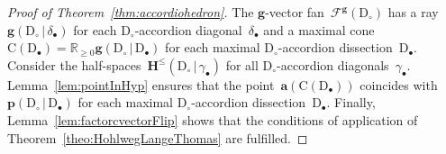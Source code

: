 \documentclass{amsart}
\theoremstyle{definition}
\newcommand{\R}{\mathbb{R}} %
\renewcommand{\b}[1]{\mathbf{#1}} %
\newcommand{\Cone}{\mathrm{C}} %
\newcommand{\dissection}{\mathrm{D}} %
\newcommand{\gvector}[2]{\mathbf{g}(#1 \,|\, #2)} %
\newcommand{\gvectors}[2]{\mathbf{g}(#1 \,|\, #2)} %
\newcommand{\gvectorFan}{\mathcal{F}^\mathbf{g}} %
\newcommand{\point}[2]{\mathbf{p}(#1  \,|\, #2)} %
\newcommand{\HS}[2]{\mathbf{H}^{\le}(#1  \,|\, #2)} %
\begin{document}
\begin{proof}[Proof of Theorem~\ref{thm:accordiohedron}]
The $\b{g}$-vector fan~$\gvectorFan(\dissection_\circ)$ has a ray~$\gvector{\dissection_\circ}{\delta_\bullet}$ for each $\dissection_\circ$-accordion diagonal~$\delta_\bullet$ and a maximal cone~$\Cone(\dissection_\bullet) = \R_{\ge0} \gvectors{\dissection_\circ}{\dissection_\bullet}$ for each maximal $\dissection_\circ$-accordion dissection~$\dissection_\bullet$. Consider the half-spaces~$\HS{\dissection_\circ}{\gamma_\bullet}$ for all $\dissection_\circ$-accordion diagonals~$\gamma_\bullet$. Lemma~\ref{lem:pointInHyp} ensures that the point~$\b{a}(\Cone(\dissection_\bullet))$ coincides with~$\point{\dissection_\circ}{\dissection_\bullet}$ for each maximal $\dissection_\circ$-accordion dissection~$\dissection_\bullet$. Finally, Lemma~\ref{lem:factorcvectorFlip} shows that the conditions of application of Theorem~\ref{theo:HohlwegLangeThomas} are fulfilled.
\end{proof}
\end{document}
